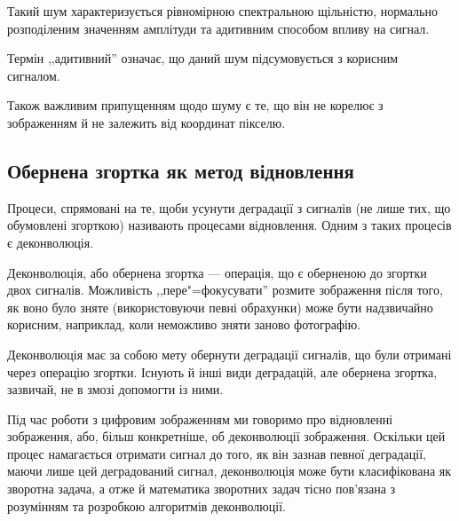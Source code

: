 \documentclass{diploma}
\begin{document}
      Такий шум характеризується рівномірною спектральною щільністю, нормально
      розподіленим значенням амплітуди та адитивним способом впливу на сигнал.

      Термін ,,адитивний'' означає, що даний шум підсумовується з
      корисним сигналом.

      Також важливим припущенням щодо шуму є те, що він не корелює з
      зображенням й не залежить від координат пікселю.
      \clearpage
    \subsection{Обернена згортка як метод відновлення}
      Процеси, спрямовані на те, щоби усунути деградації з сигналів (не лише
      тих, що обумовлені згорткою) називають процесами відновлення.
      Одним з таких процесів є деконволюція.

      Деконволюція, або обернена згортка --- операція, що є
      оберненою до згортки двох сигналів.
      Можливість ,,пере"=фокусувати'' розмите зображення після того, як воно
      було зняте (використовуючи певні обрахунки) може бути надзвичайно
      корисним, наприклад, коли неможливо зняти заново фотографію.

      Деконволюція має за собою мету обернути деградації сигналів, що були
      отримані через операцію згортки.
      Існують й інші види деградацій, але обернена згортка, зазвичай, не в
      змозі допомогти із ними.

      Під час роботи з цифровим зображенням ми говоримо про відновленні
      зображення, або, більш конкретніше, об деконволюції зображення.
      Оскільки цей процес намагається отримати сигнал до того, як він зазнав
      певної деградації, маючи лише цей деградований сигнал, деконволюція може
      бути класифікована як зворотна задача, а отже й математика
      зворотних задач тісно пов’язана з розумінням та розробкою алгоритмів
      деконволюції.
\end{document}
